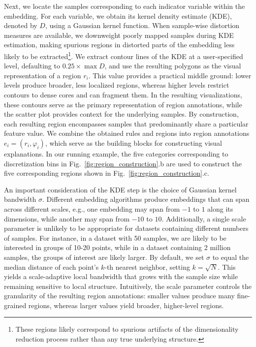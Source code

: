\documentclass[lettersize,journal]{IEEEtran}
\providecommand{\DIFadd}[1]{{\protect\color{blue}\uwave{#1}}} %
\providecommand{\DIFaddbegin}{} %
\providecommand{\DIFaddend}{} %
\providecommand{\DIFaddincludegraphics}[2][]{{\color{blue}\fbox{\DIFOincludegraphics[#1]{#2}}}} %
\DeclareRobustCommand{\DIFaddbegin}{\DIFOaddbegin \let\includegraphics\DIFaddincludegraphics} %
\DeclareRobustCommand{\DIFaddend}{\DIFOaddend \let\includegraphics\DIFOincludegraphics} %
\begin{document}
Next, we locate the samples corresponding to each indicator variable within the embedding.
For each variable, we obtain its kernel density estimate (KDE), denoted by $D$, using a Gaussian kernel function.
When sample-wise distortion measures are available, we downweight poorly mapped samples during KDE estimation, making spurious regions in distorted parts of the embedding less likely to be extracted\footnote{These regions likely correspond to spurious artifacts of the dimensionality reduction process rather than any true underlying structure.}. We \DIFaddbegin \DIFadd{describe this in more detail in Section~\ref{sec:supp-distortion}.
We }\DIFaddend extract contour lines of the KDE at a user-specified level, defaulting to $0.25 \times \max D$, and use the resulting polygons as the visual representation of a region $r_i$.
This value provides a practical middle ground: lower levels produce broader, less localized regions, whereas higher levels restrict contours to dense cores and can fragment them.
In the resulting visualizations, these contours serve as the primary representation of region annotations, while the scatter plot provides context for the underlying samples.
By construction, each resulting region encompasses samples that predominantly share a particular feature value.
We combine the obtained rules and regions into region annotations $e_i = \left( r_i, \varphi_i \right)$, which serve as the building blocks for constructing visual explanations.
In our running example, the five categories corresponding to discretization bins in Fig.~\ref{fig:region_construction}.b are used to construct the five corresponding regions shown in Fig.~\ref{fig:region_construction}.c.

An important consideration of the KDE step is the choice of Gaussian kernel bandwidth $\sigma$.
Different embedding algorithms produce embeddings that can span across different scales, e.g., one embedding may span from $-1$ to $1$ along its dimensions, while another may span from $-10$ to $10$.
Additionally, a single scale parameter is unlikely to be appropriate for datasets containing different numbers of samples. For instance, in a dataset with 50 samples, we are likely to be interested in groups of 10-\DIFaddbegin \DIFadd{-}\DIFaddend 20 points, while in a dataset containing 2 million samples, the groups of interest are likely larger.
By default, we set $\sigma$ to equal the median distance of each point's $k$-th nearest neighbor, setting $k=\sqrt{N}$. This yields a scale-adaptive local bandwidth that grows with the sample size while remaining sensitive to local structure.
Intuitively, the scale parameter controls the granularity of the resulting region annotations: smaller values produce many fine-grained regions, whereas larger values yield broader, higher-level regions.
\end{document}
